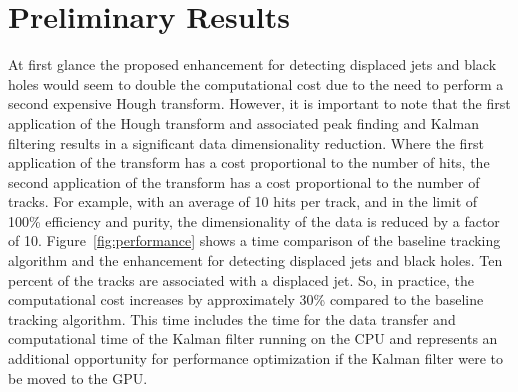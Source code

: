 \documentclass[preprint,sort&compress]{elsarticle}
\begin{document}
\section{Preliminary Results}

At first glance the proposed enhancement for detecting displaced jets and black holes would seem to double the computational cost due to the need to perform a second expensive Hough transform.  However, it is important to note that the first application of the Hough transform and associated peak finding and Kalman filtering results in a significant data dimensionality reduction.  Where the first application of the transform has a cost proportional to the number of hits, the second application of the transform has a cost proportional to the number of tracks.  For example, with an average of 10 hits per track, and in the limit of 100\% efficiency and purity, the dimensionality of the data is reduced by a factor of 10.  Figure~\ref{fig:performance} shows a time comparison of the baseline tracking algorithm and the enhancement for detecting displaced jets and black holes.  Ten percent of the tracks are associated with a displaced jet.  So, in practice, the computational cost increases by approximately 30\% compared to the baseline tracking algorithm.  This time includes the time for the data transfer and computational time of the Kalman filter running on the CPU and represents an additional opportunity for performance optimization if the Kalman filter were to be moved to the GPU.
\end{document}
